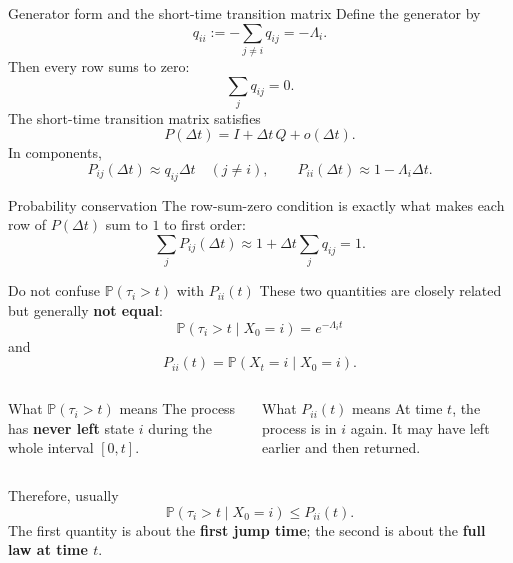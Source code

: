 \documentclass[aspectratio=169,professionalfonts]{beamer}
\newcommand{\Prob}{\mathbb{P}}
\begin{document}
\begin{frame}{Generator form and the short-time transition matrix}
\small
Define the generator by
\[
q_{ii}:=-\sum_{j\neq i}q_{ij}=-\Lambda_i.
\]
Then every row sums to zero:
\[
\sum_j q_{ij}=0.
\]
The short-time transition matrix satisfies
\[
P(\Delta t)=I+\Delta t\,Q+o(\Delta t).
\]
In components,
\[
P_{ij}(\Delta t)\approx q_{ij}\Delta t\quad (j\neq i),
\qquad
P_{ii}(\Delta t)\approx 1-\Lambda_i\Delta t.
\]

\begin{block}{Probability conservation}
The row-sum-zero condition is exactly what makes each row of $P(\Delta t)$ sum to $1$ to first order:
\[
\sum_j P_{ij}(\Delta t)\approx 1+\Delta t\sum_j q_{ij}=1.
\]
\end{block}
\end{frame}

\begin{frame}{Do not confuse $\Prob(\tau_i>t)$ with $P_{ii}(t)$}
\small
These two quantities are closely related but generally \textbf{not equal}:
\[
\Prob(\tau_i>t\mid X_0=i)=e^{-\Lambda_i t}
\]
and
\[
P_{ii}(t)=\Prob(X_t=i\mid X_0=i).
\]

\begin{columns}[T,totalwidth=\textwidth]
\begin{block}{What $\Prob(\tau_i>t)$ means}
The process has \textbf{never left} state $i$ during the whole interval $[0,t]$.
\end{block}
\begin{alertblock}{What $P_{ii}(t)$ means}
At time $t$, the process is in $i$ again. It may have left earlier and then returned.
\end{alertblock}
\end{columns}

\vspace{0.12cm}
Therefore, usually
\[
\Prob(\tau_i>t\mid X_0=i)\le P_{ii}(t).
\]
The first quantity is about the \textbf{first jump time}; the second is about the \textbf{full law at time $t$}.
\end{frame}
\end{document}
